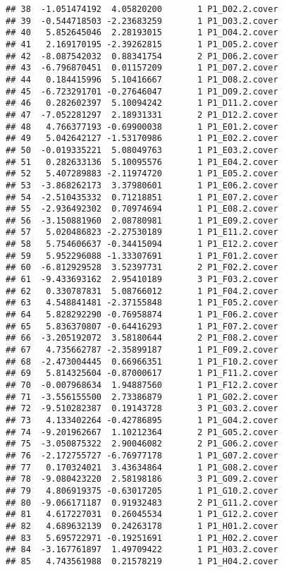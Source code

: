 \documentclass[]{article}
\begin{document}
\begin{verbatim}
## 38  -1.051474192  4.05820200       1 P1_D02.2.cover
## 39  -0.544718503 -2.23683259       1 P1_D03.2.cover
## 40   5.852645046  2.28193015       1 P1_D04.2.cover
## 41   2.169170195 -2.39262815       1 P1_D05.2.cover
## 42  -8.087542032  0.88341754       2 P1_D06.2.cover
## 43  -6.796870451  0.01157209       1 P1_D07.2.cover
## 44   0.184415996  5.10416667       1 P1_D08.2.cover
## 45  -6.723291701 -0.27646047       1 P1_D09.2.cover
## 46   0.282602397  5.10094242       1 P1_D11.2.cover
## 47  -7.052281297  2.18931331       2 P1_D12.2.cover
## 48   4.766377193 -0.69900038       1 P1_E01.2.cover
## 49   5.042642127 -1.53170986       1 P1_E02.2.cover
## 50  -0.019335221  5.08049763       1 P1_E03.2.cover
## 51   0.282633136  5.10095576       1 P1_E04.2.cover
## 52   5.407289883 -2.11974720       1 P1_E05.2.cover
## 53  -3.868262173  3.37980601       1 P1_E06.2.cover
## 54  -2.510435332  0.71218851       1 P1_E07.2.cover
## 55  -2.936492302  0.70974694       1 P1_E08.2.cover
## 56  -3.150881960  2.08780981       1 P1_E09.2.cover
## 57   5.020486823 -2.27530189       1 P1_E11.2.cover
## 58   5.754606637 -0.34415094       1 P1_E12.2.cover
## 59   5.952296088 -1.33307691       1 P1_F01.2.cover
## 60  -6.812929528  3.52397731       2 P1_F02.2.cover
## 61  -9.433693162  2.95410189       3 P1_F03.2.cover
## 62   0.330787831  5.08766012       1 P1_F04.2.cover
## 63   4.548841481 -2.37155848       1 P1_F05.2.cover
## 64   5.828292290 -0.76958874       1 P1_F06.2.cover
## 65   5.836370807 -0.64416293       1 P1_F07.2.cover
## 66  -3.205192072  3.58180644       2 P1_F08.2.cover
## 67   4.735662787 -2.35899187       1 P1_F09.2.cover
## 68  -2.473004445  0.66966351       1 P1_F10.2.cover
## 69   5.814325604 -0.87000617       1 P1_F11.2.cover
## 70  -0.007968634  1.94887560       1 P1_F12.2.cover
## 71  -3.556155500  2.73386879       1 P1_G02.2.cover
## 72  -9.510282387  0.19143728       3 P1_G03.2.cover
## 73   4.133402264 -0.42786895       1 P1_G04.2.cover
## 74  -9.201962667  1.10212364       2 P1_G05.2.cover
## 75  -3.050875322  2.90046082       2 P1_G06.2.cover
## 76  -2.172755727 -6.76977178       1 P1_G07.2.cover
## 77   0.170324021  3.43634864       1 P1_G08.2.cover
## 78  -9.080423220  2.58198186       3 P1_G09.2.cover
## 79   4.806919375 -0.63017205       1 P1_G10.2.cover
## 80  -9.066171187  0.91932483       2 P1_G11.2.cover
## 81   4.617227031  0.26045534       1 P1_G12.2.cover
## 82   4.689632139  0.24263178       1 P1_H01.2.cover
## 83   5.695722971 -0.19251691       1 P1_H02.2.cover
## 84  -3.167761897  1.49709422       1 P1_H03.2.cover
## 85   4.743561988  0.21578219       1 P1_H04.2.cover

\end{verbatim}
\end{document}
